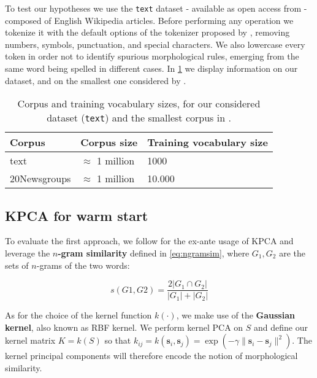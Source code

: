 
To test our hypotheses we use the \texttt{text} dataset - available as open access from \cite{lhoest_huggingfacedatasets_2021} - composed of English Wikipedia articles.
Before performing any operation we tokenize it with the default options of the tokenizer proposed by \cite{wolf-etal-2020-transformers}, removing numbers, symbols, punctuation, and special characters. 
We also lowercase every token in order not to identify spurious morphological rules, emerging from the same word being spelled in different cases. 
In \cref{table:data} we display information on our dataset, and on the smallest one considered by \cite{gupta_improving_2019}.


\begin{table}[h!]

\centering

\begin{tabular}{|l|l|l|}
\hline
\rowcolor[HTML]{C0C0C0} 
Corpus & Corpus size & Training vocabulary size \\ \hline
\cellcolor[HTML]{C0C0C0} text & $\approx$ 1 million &  1000\\ \hline
\cellcolor[HTML]{C0C0C0} 20Newsgroups & $\approx$ 1 million & 10.000\\ \hline
\end{tabular}
\caption{Corpus and training vocabulary sizes, for our considered dataset (\texttt{text}) and the smallest corpus in \cite{gupta_improving_2019}.}
\label{table:data}
\end{table}


\subsection{KPCA for warm start}
To evaluate the first approach, we follow \cite{gupta_improving_2019} for the ex-ante usage of KPCA and leverage the \textbf{$n$-gram similarity} defined in \cref{eq:ngramsim}, where $G_1, G_2$ are the sets of $n$-grams of the two words:

\begin{equation}
    s(G1, G2) = \frac{2 | G_1 \cap G_2 |}{|G_1| + |G_2|}
    \label{eq:ngramsim}
\end{equation}

As for the choice of the kernel function $k(\cdot)$, we make use of the \textbf{Gaussian kernel}, also known as RBF kernel. We perform kernel PCA on $S$ and define our kernel matrix $K = k(S)$ so that $k_{ij} = k(\mathbf{s}_i, \mathbf{s}_j) =  \exp(-\gamma\|\mathbf{s}_i - \mathbf{s}_j\|^2)$. The kernel principal components will therefore encode the notion of morphological similarity. 

